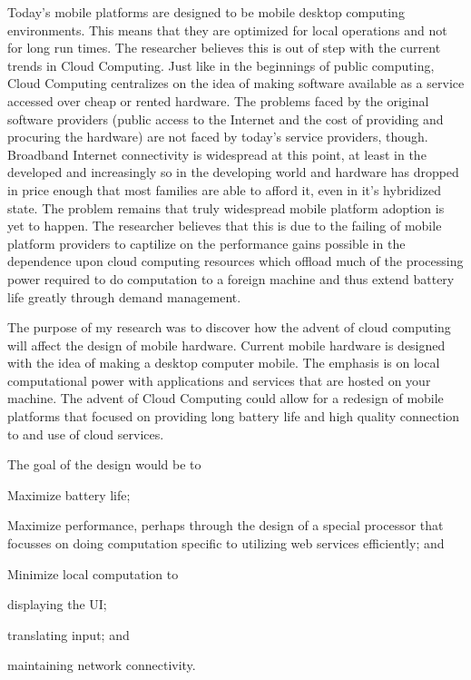 \documentclass[12pt,oneside,letterpaper,titlepage]{report}
\begin{document}
Today's mobile platforms are designed to be mobile desktop computing
environments.  This means that they are optimized for local operations and not
for long run times.  The researcher believes this is out of step with the
current trends in Cloud Computing.  Just like in the beginnings of public
computing, Cloud Computing centralizes on the idea of making software available
as a service accessed over cheap or rented hardware.  The problems faced by the
original software providers (public access to the Internet and the cost of
providing and procuring the hardware) are not faced by today's service
providers, though.  Broadband Internet connectivity is widespread at this point,
at least in the developed and increasingly so in the developing world and
hardware has dropped in price enough that most families are able to afford it,
even in it's hybridized state.  The problem remains that truly widespread mobile
platform adoption is yet to happen.  The researcher believes that this is due to
the failing of mobile platform providers to captilize on the performance gains
possible in the dependence upon cloud computing resources which offload much of
the processing power required to do computation to a foreign machine and thus
extend battery life greatly through demand management.

The purpose of my research was to discover how the advent of cloud computing
will affect the design of mobile hardware.  Current mobile hardware is designed
with the idea of making a desktop computer mobile.  The emphasis is on local
computational power with applications and services that are hosted on your
machine.  The advent of Cloud Computing could allow for a redesign of mobile
platforms that focused on providing long battery life and high quality
connection to and use of cloud services.

The goal of the design would be to 
\begin{inparaenum}[(1)]
\item Maximize battery life;
\item Maximize performance, perhaps through the design of a special processor
  that focusses on doing computation specific to utilizing web services
  efficiently; and
\item Minimize local computation to 
  \begin{inparaenum}[(a)]
  \item displaying the UI;
  \item translating input; and
  \item maintaining network connectivity.
  \end{inparaenum}
\end{inparaenum}
\end{document}
